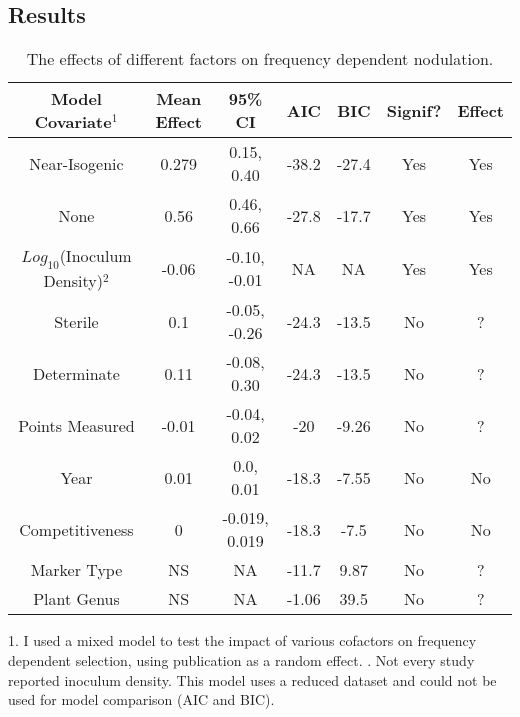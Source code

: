 \documentclass[12pt]{article}
\begin{document}
\begin{doublespace}
\subsection{Results}


\begin{table}[]
	\centering
	
	\label{BNtab1}
		\caption{The effects of different factors on frequency dependent nodulation.  %
		}
	\begin{tabular}{@{}ccccccc@{}}
		\toprule
		\textbf{Model Covariate$^{1}$} & \textbf{Mean Effect} & \textbf{95\% CI}    & \textbf{AIC} & \textbf{BIC} & \textbf{Signif?} & \textbf{Effect} \\ \midrule
		Near-Isogenic            & 0.279                & 0.15, 0.40    & -38.2        & -27.4        & Yes                   & Yes             \\
		None                     & 0.56                 & 0.46, 0.66    & -27.8        & -17.7        & Yes                   & Yes             \\
		$Log_{10}$(Inoculum Density)$^{2}$  & -0.06                & -0.10, -0.01  & NA           & NA           & Yes                   & Yes             \\
		Sterile                  & 0.1                  & -0.05, -0.26  & -24.3        & -13.5        & No                    & ?    \\
		Determinate              & 0.11                 & -0.08, 0.30   & -24.3        & -13.5        & No                    & ?    \\
		Points Measured          & -0.01                & -0.04, 0.02   & -20          & -9.26        & No                    & ?    \\
		Year                     & 0.01                 & 0.0, 0.01    & -18.3        & -7.55        & No                    & No              \\
		Competitiveness          & 0                    & -0.019, 0.019 & -18.3        & -7.5         & No                    & No              \\
		Marker Type              & NS      & NA                  & -11.7        & 9.87         & No                    & ?   \\
		Plant Genus              & NS     & NA                  & -1.06        & 39.5         & No                    & ?   \\ \bottomrule
	\end{tabular}
	\begin{flushleft}
	1. I used a mixed model to test the impact of various cofactors on frequency dependent selection, using publication as a random effect. . Not every study reported inoculum density. This model uses a reduced dataset and could not be used for model comparison (AIC and BIC).
	\end{flushleft}


\end{table}
\end{doublespace}
\end{document}

